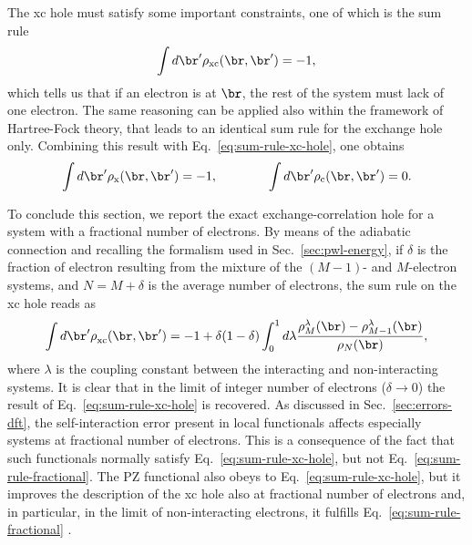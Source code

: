 The xc hole must satisfy some important constraints, one of which is the sum rule
%
\begin{equation}
    \int d\br' \rho_{\rm xc}(\br,\br') = -1 ,
    \label{eq:sum-rule-xc-hole}
\end{equation}
%
which tells us that if an electron is at $\br$, the rest of the system must lack of one electron. The same reasoning can be applied also within the framework of Hartree-Fock theory, that leads to an identical sum rule for the exchange hole only. Combining this result with Eq.~\eqref{eq:sum-rule-xc-hole}, one obtains
%
\begin{equation}
    \int d\br' \rho_{\rm x}(\br,\br') = -1, \qquad \qquad \int d\br' \rho_{\rm c}(\br,\br') = 0 .
    \label{eq:sum-rule-x-hole-c-hole}
\end{equation}

To conclude this section, we report the exact exchange-correlation hole for a system with a fractional number of electrons. By means of the adiabatic connection and recalling the formalism used in Sec.~\ref{sec:pwl-energy}, if $\delta$ is the fraction of electron resulting from the mixture of the $(M-1)$- and $M$-electron systems, and $N=M+\delta$ is the average number of electrons, the sum rule on the xc hole reads as \cite{perdew_what_1985}
%
\begin{equation}
    \int d\br' \rho_{\rm xc}^{\rm}(\br,\br') = -1 + \delta(1-\delta) \int_0^1 d\lambda \frac{\rho_{M}^{\lambda}(\br) - \rho_{M-1}^{\lambda}(\br)}{\rho_N(\br)} ,
    \label{eq:sum-rule-fractional}
\end{equation}
%
where $\lambda$ is the coupling constant between the interacting and non-interacting systems. It is clear that in the limit of integer number of electrons ($\delta \longrightarrow 0$) the result of Eq.~\eqref{eq:sum-rule-xc-hole} is recovered. As discussed in Sec.~\ref{sec:errors-dft}, the self-interaction error present in local functionals affects especially systems at fractional number of electrons. This is a consequence of the fact that such functionals normally satisfy Eq.~\eqref{eq:sum-rule-xc-hole}, but not Eq.~\eqref{eq:sum-rule-fractional}. The PZ functional also obeys to Eq.~\eqref{eq:sum-rule-xc-hole}, but it improves the description of the xc hole also at fractional number of electrons and, in particular, in the limit of non-interacting electrons, it fulfills Eq.~\eqref{eq:sum-rule-fractional} \cite{perdew_what_1985}.